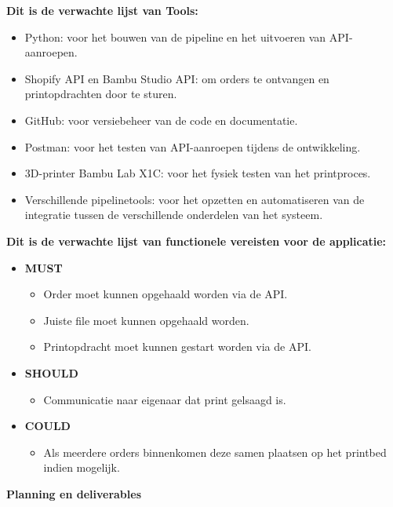 \vspace{1em}
\textbf{Dit is de verwachte lijst van Tools:}\\
\begin{itemize}
    \item Python: voor het bouwen van de pipeline en het uitvoeren van API-aanroepen.
    \item Shopify API en Bambu Studio API: om orders te ontvangen en printopdrachten door te sturen.
    \item GitHub: voor versiebeheer van de code en documentatie.
    \item Postman: voor het testen van API-aanroepen tijdens de ontwikkeling.
    \item 3D-printer Bambu Lab X1C: voor het fysiek testen van het printproces.
    \item Verschillende pipelinetools: voor het opzetten en automatiseren van de integratie tussen de verschillende onderdelen van het systeem.
\end{itemize}

\vspace{1em}
\textbf{Dit is de verwachte lijst van functionele vereisten voor de applicatie:}\\
\begin{itemize}
    \item \textbf{MUST}
    \begin{itemize}
        \item Order moet kunnen opgehaald worden  via de API.
        \item Juiste file moet kunnen opgehaald worden.
        \item Printopdracht moet kunnen gestart worden via de API.
    \end{itemize}
    \item \textbf{SHOULD}
    \begin{itemize}
        \item Communicatie naar eigenaar dat print gelsaagd is.
    \end{itemize}
    \item \textbf{COULD}
    \begin{itemize}
        \item Als meerdere orders binnenkomen deze samen plaatsen op het printbed indien mogelijk.
    \end{itemize}
\end{itemize}

\vspace{1em}
\textbf{Planning en deliverables}

